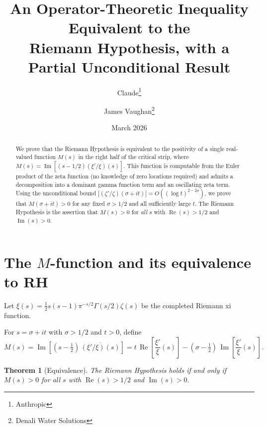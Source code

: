 \documentclass[11pt,a4paper]{article}
\title{An Operator-Theoretic Inequality Equivalent to the\\
Riemann Hypothesis, with a Partial Unconditional Result}
\author{Claude\thanks{Anthropic} \and James Vaughan\thanks{Denali Water Solutions}}
\date{March 2026}
\newtheorem{theorem}{Theorem}
\DeclareMathOperator{\re}{Re}
\DeclareMathOperator{\im}{Im}
\begin{document}
\maketitle

\begin{abstract}
We prove that the Riemann Hypothesis is equivalent to the positivity
of a single real-valued function $M(s)$ in the right half of the
critical strip, where $M(s) = \im[(s - 1/2)\overline{(\xi'/\xi)(s)}]$.
This function is computable from the Euler product of the zeta
function (no knowledge of zero locations required) and admits a
decomposition into a dominant gamma function term and an oscillating
zeta term. Using the unconditional bound
$|(\zeta'/\zeta)(\sigma+it)| = O((\log t)^{2-2\sigma})$, we prove
that $M(\sigma+it) > 0$ for any fixed $\sigma > 1/2$ and all
sufficiently large $t$. The Riemann Hypothesis is the assertion that
$M(s) > 0$ for \emph{all} $s$ with $\re(s) > 1/2$ and $\im(s) > 0$.
\end{abstract}

\section{The $M$-function and its equivalence to RH}

Let $\xi(s) = \tfrac{1}{2}s(s-1)\pi^{-s/2}\Gamma(s/2)\zeta(s)$ be
the completed Riemann xi function.

\begin{definition}
For $s = \sigma + it$ with $\sigma > 1/2$ and $t > 0$, define
\begin{equation}\label{eq:M-def}
  M(s) = \im\!\left[(s - \tfrac{1}{2})\,
    \overline{(\xi'/\xi)(s)}\right]
  = t\,\re\!\left[\frac{\xi'}{\xi}(s)\right]
    - (\sigma - \tfrac{1}{2})\,\im\!\left[\frac{\xi'}{\xi}(s)\right].
\end{equation}
\end{definition}

\begin{theorem}[Equivalence]\label{thm:equiv}
The Riemann Hypothesis holds if and only if $M(s) > 0$ for all
$s$ with $\re(s) > 1/2$ and $\im(s) > 0$.
\end{theorem}
\end{document}
